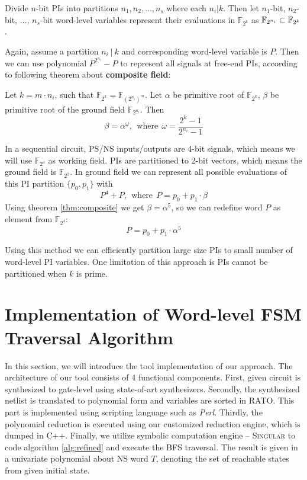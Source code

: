 \begin{Proposition}
Divide $n$-bit PIs into partitions $n_1,n_2,\dots, n_s$ where each $n_i|k$. Then let $n_1$-bit, $n_2$-bit, $\dots$, $n_s$-bit word-level variables
represent their evaluations in $\mathbb F_{2^k}$ as ${\mathbb{F}}_{2^{n_i}} \subset {\mathbb{F}}_{2^k}$.
\end{Proposition}

Again, assume a partition $n_i~|~k$ and corresponding word-level variable is $P$. Then we can use polynomial
$P^{2^{n_i}}-P$ to represent all signals at free-end PIs, according to following theorem about {\bf composite
field}:
\begin{Theorem}
\label{thm:composite}
Let $k = m\cdot n_i$, such that $\mathbb F_{2^k} = \mathbb F_{(2^{n_i})^m}$. Let $\alpha$ be primitive root of 
$\mathbb F_{2^k}$, $\beta$ be primitive root of the ground field $\mathbb F_{2^{n_i}}$. Then
$$\beta = \alpha^\omega,~~\text{where}~~\omega = \frac{2^k-1}{2^{n_i}-1}$$
\end{Theorem}
\begin{Example}
\label{ex:PI}
In a sequential circuit, PS/NS inputs/outputs are 4-bit signals, which means we will use $\mathbb F_{2^4}$
as working field. PIs are partitioned to 2-bit vectors, which means the ground field is $\mathbb F_{2^2}$.
In ground field we can represent all possible evaluations of this PI partition $\{p_0,p_1\}$ with
$$P^4+P,~~\text{where}~~P=p_0+p_1\cdot\beta$$
Using theorem \ref{thm:composite} we get $\beta = \alpha^5$, so we can redefine word $P$ as element from $\mathbb F_{2^4}$:
$$P = p_0 + p_1\cdot\alpha^5$$
\end{Example}
Using this method we can efficiently partition large size PIs to small number of word-level PI variables.
One limitation of this approach is PIs cannot be partitioned when $k$ is prime.

\section{Implementation of Word-level FSM Traversal Algorithm}
In this section, we will introduce the tool implementation of our approach.
The architecture of our tool consists of 4 functional components.
First, given circuit is synthesized to gate-level using state-of-art synthesizers.
Secondly, the synthesized netlist is translated to polynomial form and variables are sorted in 
RATO. This part is implemented using scripting language such as \emph{Perl}. Thirdly, 
the polynomial reduction is executed using our customized reduction engine, which is dumped in C++.
Finally, we utilize symbolic computation engine -- \textsc{Singular} \cite{DGPS} to code algorithm 
\ref{alg:refined} and execute the BFS traversal. The result is given in a univariate polynomial 
about NS word $T$, denoting the set of reachable states from given initial state.

